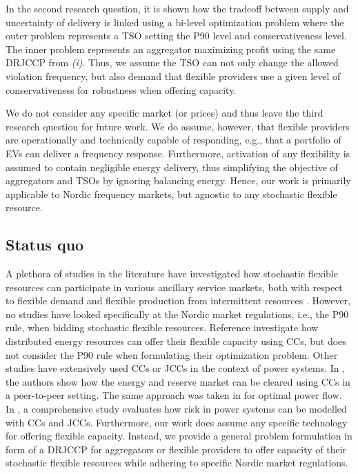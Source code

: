 \documentclass[conference]{IEEEtran}
\begin{document}
In the second research question, it is shown how the tradeoff between supply and uncertainty of delivery is linked using a bi-level optimization problem where the outer problem represents a \ac{TSO} setting the P90 level and conservativeness level. The inner problem represents an aggregator maximizing profit using the same \ac{DRJCCP} from \textit{(i)}. Thus, we assume the \ac{TSO} can not only change the allowed violation frequency, but also demand that flexible providers use a given level of conservativeness for robustness when offering capacity.

We do not consider any specific market (or prices) and thus leave the third research question for future work. We do assume, however, that flexible providers are operationally and technically capable of responding, e.g., that a portfolio of \acp{EV} can deliver a frequency response. Furthermore, activation of any flexibility is assumed to contain negligible energy delivery, thus simplifying the objective of aggregators and \acp{TSO} by ignoring balancing energy. Hence, our work is primarily applicable to Nordic frequency markets, but agnostic to any stochastic flexible resource.

\subsection{Status quo}

A plethora of studies in the literature have investigated how stochastic flexible resources can participate in various ancillary service markets, both with respect to flexible demand  \cite{bondy2016procedure, bondy2014performance, biegel2014integration, AchievingControllabilityofElectricLoads} and flexible production from intermittent resources \cite{hansen2016provision, ullah2009wind, morey2023comprehensive, alshehri2019modelling}. However, no studies have looked specifically at the Nordic market regulations, i.e., the P90 rule, when bidding stochastic flexible resources. Reference \cite{zhang2018data} investigate how distributed energy resources can offer their flexible capacity using \acp{CC}, but does not consider the P90 rule when formulating their optimization problem. Other studies have extensively used \acp{CC} or \acp{JCC} in the context of power systems. In \cite{guo2020chance}, the authors show how the energy and reserve market can be cleared using \acp{CC} in a peer-to-peer setting. The same approach was taken in \cite{bienstock2014chance} for optimal power flow. In \cite{roald2016optimization}, a comprehensive study evaluates how risk in power systems can be modelled with \acp{CC} and \acp{JCC}. Furthermore, our work does assume any specific technology for offering flexible capacity. Instead, we provide a general problem formulation in form of a \ac{DRJCCP} for aggregators or flexible providers to offer capacity of their stochastic flexible resources while adhering to specific Nordic market regulations.
\end{document}
